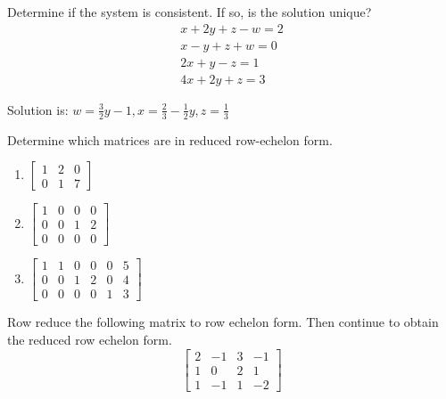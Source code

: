 \documentclass{ximera}
\begin{document}
\begin{problem}\label{prb:2.16}
Determine if the system is consistent. If so, is the solution unique?
\begin{equation*}
\begin{array}{c}
x+2y+z-w=2 \\
x-y+z+w=0 \\
2x+y-z=1 \\
4x+2y+z=3
\end{array}
\end{equation*}
\begin{hint}
Solution is: $ w=\frac{3}{2}y-1, x=\frac{2}{3}-\frac{1}{2}y, z=\frac{1}{3} $
\end{hint}
\end{problem}

\begin{problem}\label{prb:2.17} Determine which matrices are in reduced row-echelon form.

\begin{enumerate}
\item $\left[
\begin{array}{rrr}
1 & 2 & 0 \\
0 & 1 & 7
\end{array}
\right] $  

\item $\left[
\begin{array}{rrrr}
1 & 0 & 0 & 0 \\
0 & 0 & 1 & 2 \\
0 & 0 & 0 & 0
\end{array}
\right] $ 

\item $\left[
\begin{array}{rrrrrr}
1 & 1 & 0 & 0 & 0 & 5 \\
0 & 0 & 1 & 2 & 0 & 4 \\
0 & 0 & 0 & 0 & 1 & 3
\end{array}
\right] $ 

\end{enumerate}
\end{problem}

\begin{problem}\label{prb:2.18} Row reduce the following matrix to row echelon form. Then continue to obtain the reduced row echelon form.
\begin{equation*}
\left[
\begin{array}{rrrr}
2 & -1 & 3 & -1 \\
1 & 0 & 2 & 1 \\
1 & -1 & 1 & -2
\end{array}
\right]
\end{equation*}
\end{problem}
\end{document}
